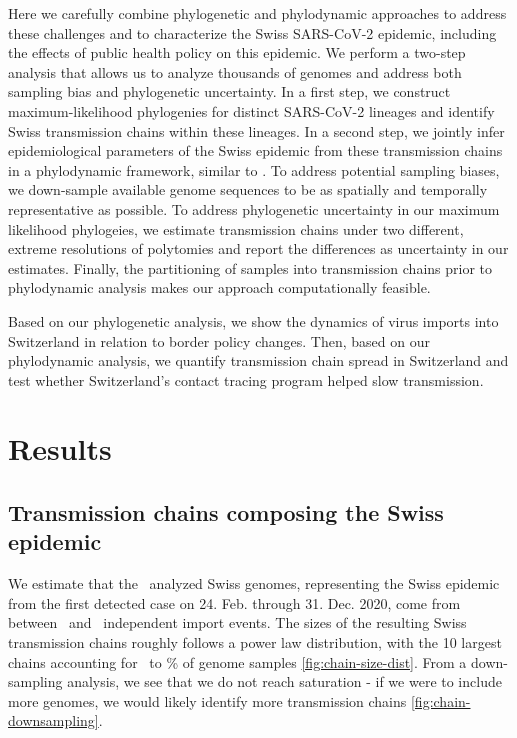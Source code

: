 \documentclass[9pt,twocolumn,twoside,lineno]{pnas-new}
\begin{document}
Here we carefully combine phylogenetic and phylodynamic approaches to address these challenges and to characterize the Swiss SARS-CoV-2 epidemic, including the effects of public health policy on this epidemic. We perform a two-step analysis that allows us to analyze thousands of genomes and address both sampling bias and phylogenetic uncertainty. In a first step, we construct maximum-likelihood phylogenies for distinct SARS-CoV-2 lineages and identify Swiss transmission chains within these lineages. In a second step, we jointly infer epidemiological parameters of the Swiss epidemic from these transmission chains in a phylodynamic framework, similar to \cite{Muller2020, Muller2020a}. To address potential sampling biases, we down-sample available genome sequences to be as spatially and temporally representative as possible. To address phylogenetic uncertainty in our maximum likelihood phylogeies, we estimate transmission chains under two different, extreme resolutions of polytomies and report the differences as uncertainty in our estimates. Finally, the partitioning of samples into transmission chains prior to phylodynamic analysis makes our approach computationally feasible.

Based on our phylogenetic analysis, we show the dynamics of virus imports into Switzerland in relation to border policy changes. Then, based on our phylodynamic analysis, we quantify transmission chain spread in Switzerland and test whether Switzerland’s contact tracing program helped slow transmission.

\section{Results}

\subsection{Transmission chains composing the Swiss epidemic}

We estimate that the \nswissseqs\ analyzed Swiss genomes, representing the Swiss epidemic from the first detected case on 24. Feb. through 31. Dec. 2020, come from between \nchainsmin\ and \nchainsmax\ independent import events. The sizes of the resulting Swiss transmission chains roughly follows a power law distribution, with the 10 largest chains accounting for \maxlargestchainsper\ to \minlargestchainsper \% of genome samples \ref{fig:chain-size-dist}. From a down-sampling analysis, we see that we do not reach saturation - if we were to include more genomes, we would likely identify more transmission chains \ref{fig:chain-downsampling}. 
\end{document}
